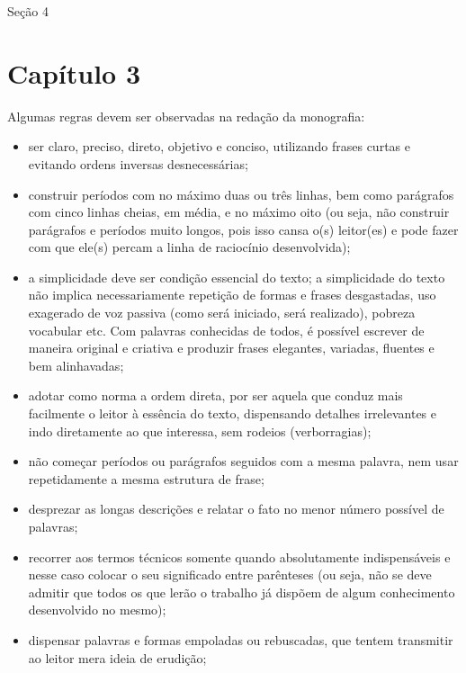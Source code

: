 \documentclass[
	12pt,				%
	openright,			%
	oneside,	
	a4paper,				%
	english,				%
	brazil				%
]{abntex2/abntex2} %
\begin{document}
		Seção 4

\chapter{Capítulo 3}

	Algumas regras devem ser observadas na redação da monografia:

	\begin{itemize}
		\item ser claro, preciso, direto, objetivo e conciso, utilizando frases curtas e evitando ordens inversas desnecessárias;
		
		\item construir períodos com no máximo duas ou três linhas, bem como parágrafos com cinco linhas cheias, em média, e no máximo oito (ou seja, não construir parágrafos e períodos muito longos, pois isso cansa o(s) leitor(es) e pode fazer com que ele(s) percam a linha de raciocínio desenvolvida);
		
		\item a simplicidade deve ser condição essencial do texto; a simplicidade do texto não implica necessariamente repetição de formas e frases desgastadas, uso exagerado de voz passiva (como será iniciado, será realizado), pobreza vocabular etc. Com palavras conhecidas de todos, é possível escrever de maneira original e criativa e produzir frases elegantes, variadas, fluentes e bem alinhavadas;
		
		\item adotar como norma a ordem direta, por ser aquela que conduz mais facilmente o leitor à essência do texto, dispensando detalhes irrelevantes e indo diretamente ao que interessa, sem rodeios (verborragias);

		\item não começar períodos ou parágrafos seguidos com a mesma palavra, nem usar repetidamente a mesma estrutura de frase;

		\item desprezar as longas descrições e relatar o fato no menor número possível de palavras;
		
		\item recorrer aos termos técnicos somente quando absolutamente indispensáveis e nesse caso colocar o seu significado entre parênteses (ou seja, não se deve admitir que todos os que lerão o trabalho já dispõem de algum conhecimento desenvolvido no mesmo);
		
		\item dispensar palavras e formas empoladas ou rebuscadas, que tentem
transmitir ao leitor mera ideia de erudição;


\end{itemize}
\end{document}
